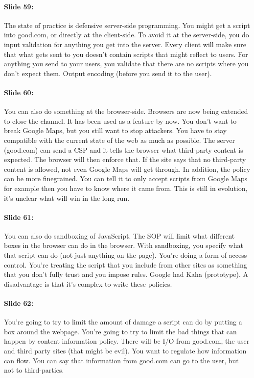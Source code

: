 \documentclass[10pt,a4paper]{report}
\begin{document}
\paragraph{Slide 59:} The state of practice is defensive server-side programming. You might get a script into good.com, or directly at the client-side. To avoid it at the server-side, you do input validation for anything you get into the server. Every client will make sure that what gets sent to you doesn't contain scripts that might reflect to users. For anything you send to your users, you validate that there are no scripts where you don't expect them. Output encoding (before you send it to the user). 

\paragraph{Slide 60:} You can also do something at the browser-side. Browsers are now being extended to close the channel. It has been used as a feature by now. You don't want to break Google Maps, but you still want to stop attackers. You have to stay compatible with the current state of the web as much as possible. The server (good.com) can send a CSP and it tells the browser what third-party content is expected. The browser will then enforce that. If the site says that no third-party content is allowed, not even Google Maps will get through. In addition, the policy can be more finegrained. You can tell it to only accept scripts from Google Maps for example then you have to know where it came from. This is still in evolution, it's unclear what will win in the long run.

\paragraph{Slide 61:} You can also do sandboxing of JavaScript. The SOP will limit what different boxes in the browser can do in the browser. With sandboxing, you specify what that script can do (not just anything on the page). You're doing a form of access control. You're treating the script that you include from other sites as something that you don't fully trust and you impose rules. Google had Kaha (prototype). A disadvantage is that it's complex to write these policies.

\paragraph{Slide 62:} You're going to try to limit the amount of damage a script can do by putting a box around the webpage. You're going to try to limit the bad things that can happen by content information policy. There will be I/O from good.com, the user and third party sites (that might be evil). You want to regulate how information can flow. You can say that information from good.com can go to the user, but not to third-parties.
\end{document}
